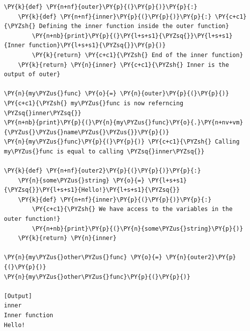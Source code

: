 \begin{Verbatim}[label=\makebox{\url{https://github.com/lucabaldini/cmepda/tree/master/slides/latex/snippets/inner\_outer.py}},commandchars=\\\{\}]
\PY{k}{def} \PY{n+nf}{outer}\PY{p}{(}\PY{p}{)}\PY{p}{:}   
    \PY{k}{def} \PY{n+nf}{inner}\PY{p}{(}\PY{p}{)}\PY{p}{:} \PY{c+c1}{\PYZsh{} Defining the inner function inside the outer function}
        \PY{n+nb}{print}\PY{p}{(}\PY{l+s+s1}{\PYZsq{}}\PY{l+s+s1}{Inner function}\PY{l+s+s1}{\PYZsq{}}\PY{p}{)}
        \PY{k}{return} \PY{c+c1}{\PYZsh{} End of the inner function}
    \PY{k}{return} \PY{n}{inner} \PY{c+c1}{\PYZsh{} Inner is the output of outer}
    
\PY{n}{my\PYZus{}func} \PY{o}{=} \PY{n}{outer}\PY{p}{(}\PY{p}{)} \PY{c+c1}{\PYZsh{} my\PYZus{}func is now referncing \PYZsq{}inner\PYZsq{}}
\PY{n+nb}{print}\PY{p}{(}\PY{n}{my\PYZus{}func}\PY{o}{.}\PY{n+nv+vm}{\PYZus{}\PYZus{}name\PYZus{}\PYZus{}}\PY{p}{)}
\PY{n}{my\PYZus{}func}\PY{p}{(}\PY{p}{)} \PY{c+c1}{\PYZsh{} Calling my\PYZus{}func is equal to calling \PYZsq{}inner\PYZsq{}}

\PY{k}{def} \PY{n+nf}{outer2}\PY{p}{(}\PY{p}{)}\PY{p}{:}
    \PY{n}{some\PYZus{}string} \PY{o}{=} \PY{l+s+s1}{\PYZsq{}}\PY{l+s+s1}{Hello!}\PY{l+s+s1}{\PYZsq{}}
    \PY{k}{def} \PY{n+nf}{inner}\PY{p}{(}\PY{p}{)}\PY{p}{:}
        \PY{c+c1}{\PYZsh{} We have access to the variables in the outer function!}
        \PY{n+nb}{print}\PY{p}{(}\PY{n}{some\PYZus{}string}\PY{p}{)}
    \PY{k}{return} \PY{n}{inner}
    
\PY{n}{my\PYZus{}other\PYZus{}func} \PY{o}{=} \PY{n}{outer2}\PY{p}{(}\PY{p}{)}
\PY{n}{my\PYZus{}other\PYZus{}func}\PY{p}{(}\PY{p}{)}

[Output]
inner
Inner function
Hello!
\end{Verbatim}